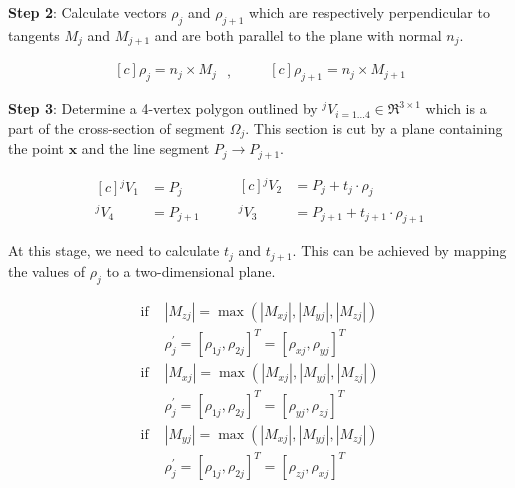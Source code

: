 \noindent \textbf{Step 2}:
Calculate vectors $\rho_j$ and $\rho_{j+1}$ which are respectively perpendicular to tangents $M_j$ and $M_{j+1}$ and are both parallel to the plane with normal $n_j$.

\begin{equation}
\begin{aligned}[c]
\rho_j = n_j \times M_j
\end{aligned}
\mbox{ , }
\qquad
\begin{aligned}[c]
\rho_{j+1} = n_j \times M_{j+1}
\end{aligned}
\label{eqt:rho}
\end{equation}

\noindent \textbf{Step 3}:
Determine a 4-vertex polygon outlined by \mbox{${^jV}_{i=1...4}\in \Re^{3 \times 1}$} which is a part of the cross-section of segment $\Omega_j$.
This section is cut by a plane containing the point $\boldsymbol{x}$ and the line segment $P_j \rightarrow P_{j+1}$.

\begin{equation}
\begin{aligned}[c]
{^jV}_1 &= P_j \\
{^jV}_4 &= P_{j+1}
\end{aligned}
\qquad
\begin{aligned}[c]
{^jV}_2 &= P_j + t_j \cdot \rho_j \\
{^jV}_3 &= P_{j+1} + t_{j+1} \cdot\rho_{j+1}
\end{aligned}
\label{eqt:vertices}
\end{equation}

At this stage, we need to calculate $t_j$ and $t_{j+1}$.
This can be achieved by mapping the values of $\rho_j$ to a two-dimensional plane.

\begin{equation}
\begin{aligned}
\mbox{if } &|M_{zj}| = \max \left ( {|M_{xj}|,|M_{yj}|,|M_{zj}|} \right ) \\
&\rho^{\prime}_j = [\rho_{1j},\rho_{2j}]^T = [\rho_{xj},\rho_{yj}]^T \\
\mbox{if } &|M_{xj}| = \max \left ( {|M_{xj}|,|M_{yj}|,|M_{zj}|} \right ) \\
&\rho^{\prime}_j = [\rho_{1j},\rho_{2j}]^T = [\rho_{yj},\rho_{zj}]^T \\
\mbox{if } &|M_{yj}| = \max \left ( {|M_{xj}|,|M_{yj}|,|M_{zj}|} \right ) \\
&\rho^{\prime}_j = [\rho_{1j},\rho_{2j}]^T = [\rho_{zj},\rho_{xj}]^T
\end{aligned}
\label{eqt:rhoprocess}
\end{equation}

